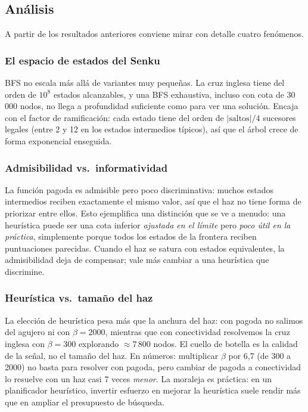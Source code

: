 \documentclass[conference,a4paper]{IEEEtran}
\begin{document}
\subsection{Análisis}

A partir de los resultados anteriores conviene mirar con detalle cuatro
fenómenos.

\subsubsection{El espacio de estados del Senku}

BFS no escala más allá de variantes muy pequeñas. La cruz inglesa tiene
del orden de $10^{8}$ estados alcanzables, y una BFS exhaustiva, incluso
con cota de 30\,000 nodos, no llega a profundidad suficiente como para
ver una solución. Encaja con el factor de ramificación: cada estado
tiene del orden de $|\text{saltos}|/4$ sucesores legales (entre 2 y 12
en los estados intermedios típicos), así que el árbol crece de forma
exponencial enseguida.

\subsubsection{Admisibilidad vs.\ informatividad}

La función pagoda es admisible pero poco discriminativa: muchos estados
intermedios reciben exactamente el mismo valor, así que el haz no tiene
forma de priorizar entre ellos. Esto ejemplifica una distinción que se
ve a menudo: una heurística puede ser una cota inferior \emph{ajustada
en el límite} pero \emph{poco útil en la práctica}, simplemente porque
todos los estados de la frontera reciben puntuaciones parecidas. Cuando
el haz se satura con estados equivalentes, la admisibilidad deja de
compensar; vale más cambiar a una heurística que discrimine.

\subsubsection{Heurística vs.\ tamaño del haz}

La elección de heurística pesa más que la anchura del haz: con pagoda
no salimos del agujero ni con $\beta=2000$, mientras que con
conectividad resolvemos la cruz inglesa con $\beta=300$ explorando
$\approx\!7\,800$ nodos. El cuello de botella es la calidad de la
señal, no el tamaño del haz. En números: multiplicar $\beta$ por 6,7
(de 300 a 2000) no basta para resolver con pagoda, pero cambiar de
pagoda a conectividad lo resuelve con un haz casi 7 veces \emph{menor}.
La moraleja es práctica: en un planificador heurístico, invertir
esfuerzo en mejorar la heurística suele rendir más que en ampliar el
presupuesto de búsqueda.
\end{document}
